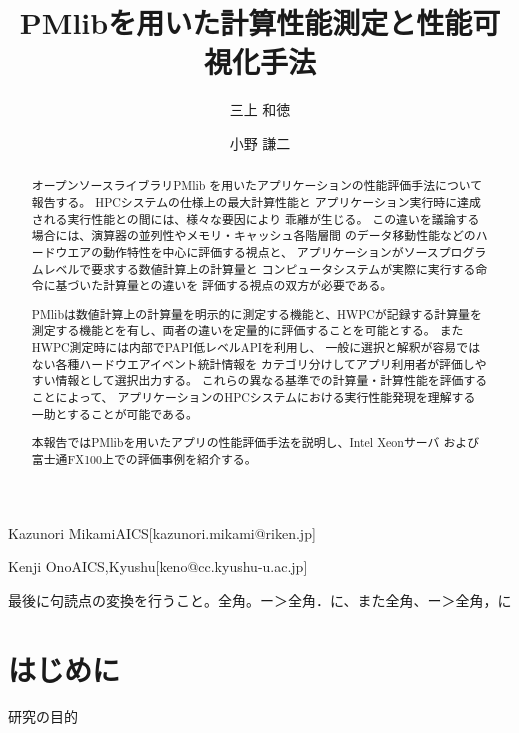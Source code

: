 \documentclass[submit,techrep,noauthor]{ipsj}
\begin{document}
\title{PMlibを用いた計算性能測定と性能可視化手法}


\author{三上 和徳}{Kazunori Mikami}{AICS}[kazunori.mikami@riken.jp]
\author{小野 謙二}{Kenji Ono}{AICS,Kyushu}[keno@cc.kyushu-u.ac.jp]

\begin{abstract}
オープンソースライブラリPMlib
を用いたアプリケーションの性能評価手法について報告する。
HPCシステムの仕様上の最大計算性能と
アプリケーション実行時に達成される実行性能との間には、様々な要因により
乖離が生じる。
この違いを議論する場合には、演算器の並列性やメモリ・キャッシュ各階層間
のデータ移動性能などのハードウエアの動作特性を中心に評価する視点と、
アプリケーションがソースプログラムレベルで要求する数値計算上の計算量と
コンピュータシステムが実際に実行する命令に基づいた計算量との違いを
評価する視点の双方が必要である。

PMlibは数値計算上の計算量を明示的に測定する機能と、HWPCが記録する計算量を
測定する機能とを有し、両者の違いを定量的に評価することを可能とする。
またHWPC測定時には内部でPAPI低レベルAPIを利用し、
一般に選択と解釈が容易ではない各種ハードウエアイベント統計情報を
カテゴリ分けしてアプリ利用者が評価しやすい情報として選択出力する。
%
%
これらの異なる基準での計算量・計算性能を評価することによって、
アプリケーションのHPCシステムにおける実行性能発現を理解する
一助とすることが可能である。

本報告ではPMlibを用いたアプリの性能評価手法を説明し、Intel Xeonサーバ
および富士通FX100上での評価事例を紹介する。
\end{abstract}

\maketitle

{ \color{blue}
最後に句読点の変換を行うこと。全角。ー＞全角．に、また全角、ー＞全角，に\\
}

\section{はじめに}
研究の目的
\end{document}
